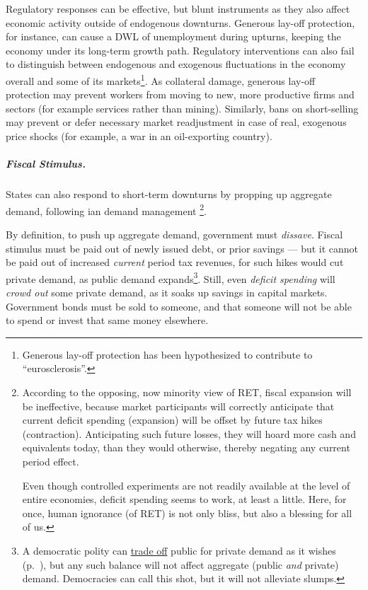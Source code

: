 Regulatory responses can be effective, but blunt instruments as they also affect economic activity outside of endogenous downturns. Generous lay-off protection, for instance, can cause a \gls{DWL} of unemployment during upturns, keeping the economy under its long-term growth path. Regulatory interventions can also fail to distinguish between endogenous and exogenous fluctuations in the economy overall and some of its markets\footnote{
	Generous lay-off protection has been hypothesized to contribute to ``eurosclerosis''.}. %
As collateral damage, generous lay-off protection may prevent workers from moving to new, more productive firms and sectors (for example services rather than mining). Similarly, bans on short-selling may prevent or defer necessary market readjustment in case of real, exogenous price shocks (for example, a war in an oil-exporting country).

\subparagraph{Fiscal Stimulus.}  \label{sec:fiscal-stimulus}
States can also respond to short-term downturns by propping up aggregate demand, following \citeauthor{Keynes1936}ian demand management \footnote{
	According to the opposing, now minority view of \gls{RET}, fiscal expansion will be ineffective, because market participants will correctly anticipate that current deficit spending (expansion) will be offset by future tax hikes (contraction). Anticipating such future losses, they will hoard more cash and equivalents today, than they would otherwise, thereby negating any current period effect.
	
	Even though controlled experiments are not readily available at the level of entire economies, deficit spending seems to work, at least a little. Here, for once, human ignorance (of \gls{RET}) is not only bliss, but also a blessing for all of us.}.

By definition, to push up aggregate demand, government must \emph{dissave}. Fiscal stimulus must be paid out of newly issued debt, or prior savings --- but it cannot be paid out of increased \emph{current} period tax revenues, for such hikes would cut private demand, as public demand expands\footnote{
	A democratic polity can \hyperref[sec:trade-offs]{trade off} public for private demand as it wishes (p.~\pageref{sec:trade-offs}), but any such balance will not affect aggregate (public \emph{and} private) demand. Democracies can call this shot, but it will not alleviate slumps.}. 
Still, even \emph{deficit spending} will \emph{crowd out} some private demand, as it soaks up savings in capital markets. Government bonds must be sold to someone, and that someone will not be able to spend or invest that same money elsewhere.

